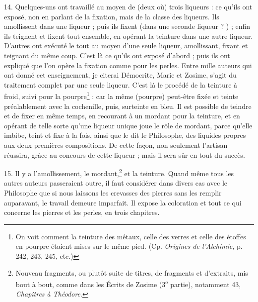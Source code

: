 \documentclass[a4paper, 11pt, oneside, polutonikogreek, french]{article}
\begin{document}
14. Quelques-uns ont travaillé au moyen de (deux où) trois liqueurs : ce qu'ils ont exposé, non en parlant de la fixation, mais de la classe des liqueurs. Ils amollissent dans une liqueur ; puis ils fixent (dans une seconde liqueur ? ) ; enfin ils teignent et fixent tout ensemble, en opérant la teinture dans une autre liqueur. D'autres ont exécuté le tout au moyen d'une seule liqueur, amollissant, fixant et teignant du même coup. C'est là ce qu'ils ont exposé d'abord ; puis ils ont expliqué que l'on opère la fixation comme pour les perles. Entre mille auteurs qui ont donné cet enseignement, je citerai Démocrite, Marie et Zosime, s'agit du traitement complet par une seule liqueur. C'est là le procédé de la teinture à froid, suivi pour la pourpre\footnote{On voit comment la teinture des métaux, celle des verres et celle des étoffes en pourpre étaient mises sur le même pied. (Cp. \emph{Origines de l'Alchimie}, p. 242, 243, 245, etc.)} : car la même (pourpre) peut-être fixée et teinte préalablement avec la cochenille, puis, surteinte en bleu. Il est possible de teindre et de fixer en même temps, en recourant à un mordant pour la teinture, et en opérant de telle sorte qu'une liqueur unique joue le rôle de mordant, parce qu'elle imbibe, teint et fixe à la fois, ainsi que le dit le Philosophe, des liquides propres aux deux premières compositions. De cette façon, non seulement l'artisan réussira, grâce au concours de cette liqueur ; mais il sera sûr en tout du succès.

15. Il y a l'amollissement, le mordant,\footnote{Nouveau fragments, ou plutôt suite de titres, de fragments et d'extraits, mis bout à bout, comme dans les Écrits de Zosime (3\textsuperscript{e} partie), notamment 43, \emph{Chapitres à Théodore}.} et la teinture. Quand même tous les autres auteurs passeraient outre, il faut considérer dans divers cas avec le Philosophe que si nous laissons les crevasses des pierres sans les remplir auparavant, le travail demeure imparfait. Il expose la coloration et tout ce qui concerne les pierres et les perles, en trois chapitres.
\end{document}

